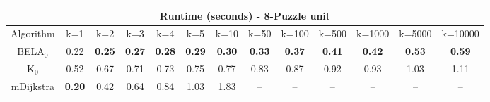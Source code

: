 \begin{tabular}{c|cccccccccccc}\toprule
\multicolumn{13}{c}{Runtime (seconds) - 8-Puzzle unit}\\ \midrule
Algorithm & k=1 & k=2 & k=3 & k=4 & k=5 & k=10 & k=50 & k=100 & k=500 & k=1000 & k=5000 & k=10000 \\ \midrule
BELA$_0$ & 0.22 & \textbf{0.25} & \textbf{0.27} & \textbf{0.28} & \textbf{0.29} & \textbf{0.30} & \textbf{0.33} & \textbf{0.37} & \textbf{0.41} & \textbf{0.42} & \textbf{0.53} & \textbf{0.59} \\
K$_0$ & 0.52 & 0.67 & 0.71 & 0.73 & 0.75 & 0.77 & 0.83 & 0.87 & 0.92 & 0.93 & 1.03 & 1.11 \\
mDijkstra & \textbf{0.20} & 0.42 & 0.64 & 0.84 & 1.03 & 1.83 & -- & -- & -- & -- & -- & -- \\ \bottomrule 
\end{tabular}
